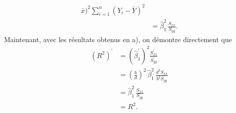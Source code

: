 \begin{solution}{2.9}
\begin{enumerate}
\begin{align*}
{          \bar{x})^2}{\sum_{i=1}^n (Y_i - \bar{Y})^2} \\
        &= \hat{\beta}_1^2\, \frac{S_{xx}}{S_{yy}}.
      \end{align*}
      Maintenant, avec les résultats obtenus en a), on démontre
      directement que
      \begin{align*}
        (R^2)^\prime
        &= (\hat{\beta}_1^\prime)^2 \frac{S_{xx}^\prime}{S_{yy}^\prime} \\
        &=
        \left(
          \frac{b}{d}
        \right)^2\,
        \hat{\beta}_1^2\, \frac{d^2 S_{xx}}{b^2 S_{yy}} \\
        &= \hat{\beta}_1^2\, \frac{S_{xx}}{S_{yy}} \\
        &= R^2.
      \end{align*}
    \end{enumerate}
  
\end{solution}
